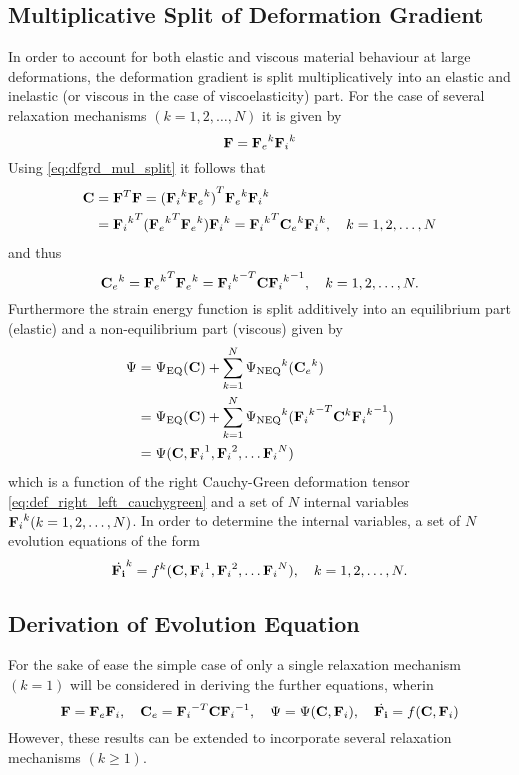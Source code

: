 \subsection{Multiplicative Split of Deformation Gradient}
In order to account for both elastic and viscous material behaviour at large deformations, the deformation gradient is split multiplicatively into an elastic and inelastic (or viscous in the case of viscoelasticity) part. For the case of several relaxation mechanisms \((k=1,2,\ldots,N)\) it is given by
\begin{equation} 
    \mathbf{F}={\mathbf{F}_{e}}^{k} {\mathbf{F}_{i}}^{k}
    \label{eq:dfgrd_mul_split}
\end{equation}
Using \cref{eq:dfgrd_mul_split} it follows that
\begin{align}
    \nonumber\mathbf{C}
    &=\mathbf{F}^{T} \mathbf{F} ={({\mathbf{F}_{i}}^{k} {\mathbf{F}_{e}}^{k})}^{T} {\mathbf{F}_{e}}^{k} {\mathbf{F}_{i}}^{k}\\
    &={{\mathbf{F}_{i}}^{k}}^{T} ({{\mathbf{F}_{e}}^{k}}^{T} {\mathbf{F}_{e}}^{k}) {\mathbf{F}_{i}}^{k}
    ={{\mathbf{F}_{i}}^{k}}^{T} {\mathbf{C}_{e}}^{k} {\mathbf{F}_{i}}^{k}, \quad k =1,2,\ldots,N
\end{align}
and thus 
\begin{equation}
    {\mathbf{C}_{e}}^{k}
     = {{\mathbf{F}_{e}}^{k}}^{T} {\mathbf{F}_{e}}^{k}
     = {{\mathbf{F}_{i}}^{k}}^{-T} {\mathbf{C}} {{\mathbf{F}_{i}}^{k}}^{-1}, \quad
    k =1,2,\ldots,N.
    \label{eq:Ce_k}
\end{equation}
Furthermore the strain energy function is split additively into an equilibrium part (elastic) and a non-equilibrium part (viscous) given by
\begin{align}
    \nonumber\Psi 
    &= \Psi_{\text{EQ}}(\mathbf{C}) + \sum_{k=1}^{N}{\Psi_{\text{NEQ}}}^{k}({\mathbf{C}_{e}}^{k}) \\
    \nonumber
    &= \Psi_{\text{EQ}}(\mathbf{C}) + \sum_{k=1}^{N}{\Psi_{\text{NEQ}}}^{k}({{\mathbf{F}_{i}}^{k}}^{-T} {\mathbf{C}}^{k} {{\mathbf{F}_{i}}^{k}}^{-1}) \\
    &= \Psi(\mathbf{C}, {\mathbf{F}_{i}}^{1}, {\mathbf{F}_{i}}^{2}, \ldots {\mathbf{F}_{i}}^{N}) 
    \label{eq:strain_energy_function_tot}
\end{align}
which is a function of the right Cauchy-Green deformation tensor \cref{eq:def_right_left_cauchygreen} and a set of \(N\) internal variables \({\mathbf{F}_{i}}^{k} (k = 1,2,\ldots,N)\). In order to determine the internal variables, a set of \(N\) evolution equations of the form 
\begin{equation}
    {\dot{\mathbf{F}_{i}}}^{k} = {f}^{k}(\mathbf{C}, {\mathbf{F}_{i}}^{1}, {\mathbf{F}_{i}}^{2}, \ldots {\mathbf{F}_{i}}^{N}), \quad
    k =1,2,\ldots,N.
\end{equation}

\subsection{Derivation of Evolution Equation}
For the sake of ease the simple case of only a single relaxation mechanism \((k=1)\) will be considered in deriving the further equations, wherin
\begin{equation}
    \mathbf{F}={\mathbf{F}_{e}} {\mathbf{F}_{i}}, \quad
    \mathbf{C}_{e} = {{\mathbf{F}_{i}}}^{-T} {\mathbf{C}} {{\mathbf{F}_{i}}}^{-1}, \quad
    \Psi = \Psi(\mathbf{C}, {\mathbf{F}_{i}}), \quad
    \dot{\mathbf{F}_{i}} = f(\mathbf{C}, {\mathbf{F}_{i}}) 
    \label{eq:visc_simple_case}
\end{equation}
However, these results can be extended to incorporate several relaxation mechanisms \((k \geq 1)\).

